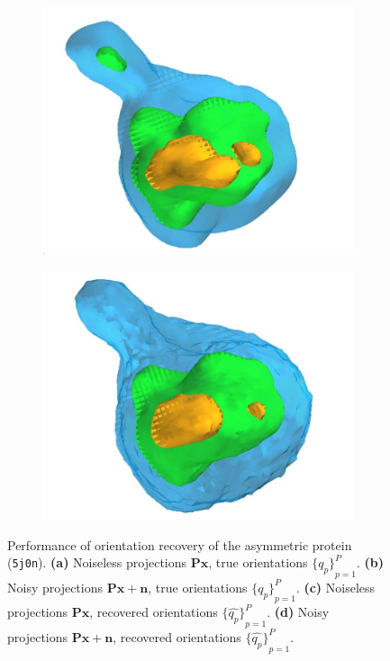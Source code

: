 \begin{figure}[ht!]
\begin{subfigure}[b]{0.22\linewidth}
        \centering
        \includegraphics[width=0.99\linewidth]{figures/5j0n_reconstruction_noise0}
        \caption{}
    \end{subfigure}
    \hfill
    \begin{subfigure}[b]{0.22\linewidth}
        \centering
        \includegraphics[width=0.99\linewidth]{figures/5j0n_reconstruction_noise16}
        \caption{}
    \end{subfigure}
    \caption{
        Performance of orientation recovery of the asymmetric protein (\texttt{5j0n}). \textbf{(a)} Noiseless projections $\mathbf{Px}$, true orientations ${\big\{q_p\big\}}_{p=1}^P$. \textbf{(b)} Noisy projections $\mathbf{Px + n}$, true orientations ${\big\{q_p\big\}}_{p=1}^P$. \textbf{(c)} Noiseless projections $\mathbf{Px}$, recovered orientations ${\big\{\widehat{q_p}\big\}}_{p=1}^P$. \textbf{(d)} Noisy projections $\mathbf{Px + n}$, recovered orientations ${\big\{\widehat{q_p}\big\}}_{p=1}^P$.
    }\label{fig:5j0n-reconstruction}
\end{figure}

